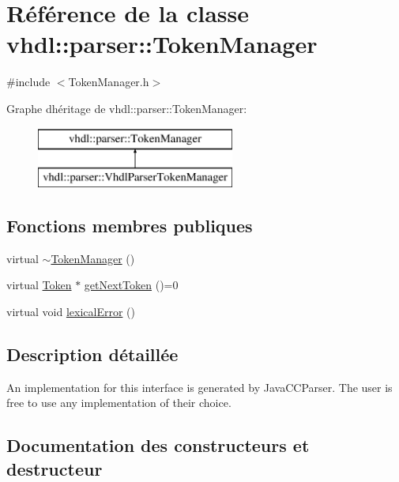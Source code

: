 \hypertarget{classvhdl_1_1parser_1_1_token_manager}{}\section{Référence de la classe vhdl\+:\+:parser\+:\+:Token\+Manager}
\label{classvhdl_1_1parser_1_1_token_manager}


{\ttfamily \#include $<$Token\+Manager.\+h$>$}

Graphe d\textquotesingle{}héritage de vhdl\+:\+:parser\+:\+:Token\+Manager\+:\begin{figure}[H]
\begin{center}
\leavevmode
\includegraphics[height=2.000000cm]{classvhdl_1_1parser_1_1_token_manager}
\end{center}
\end{figure}
\subsection*{Fonctions membres publiques}
\begin{DoxyCompactItemize}
\item 
virtual \hyperlink{classvhdl_1_1parser_1_1_token_manager_a116b81f14babf26eccaba85331ef702b}{$\sim$\+Token\+Manager} ()
\item 
virtual \hyperlink{classvhdl_1_1parser_1_1_token}{Token} $\ast$ \hyperlink{classvhdl_1_1parser_1_1_token_manager_aa753c21895956639fec2bc3240356f15}{get\+Next\+Token} ()=0
\item 
virtual void \hyperlink{classvhdl_1_1parser_1_1_token_manager_a07c59d061a25f0349a8bd1a17b05b42b}{lexical\+Error} ()
\end{DoxyCompactItemize}


\subsection{Description détaillée}
An implementation for this interface is generated by Java\+C\+C\+Parser. The user is free to use any implementation of their choice. 

\subsection{Documentation des constructeurs et destructeur}
\hypertarget{classvhdl_1_1parser_1_1_token_manager_a116b81f14babf26eccaba85331ef702b}{}
